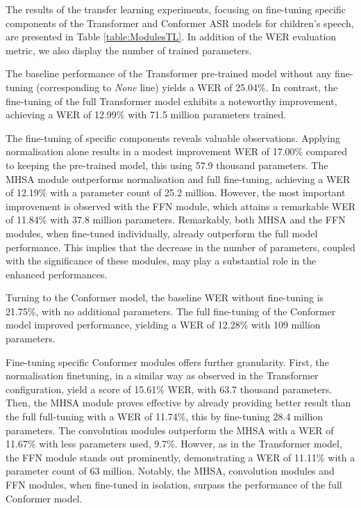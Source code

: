 The results  of the transfer learning experiments, focusing on fine-tuning specific components of the Transformer and Conformer ASR models for children's speech, are presented in Table \ref{table:ModulesTL}. In addition of the WER evaluation metric, we also display the number of trained parameters. 

The baseline performance of the Transformer pre-trained model without any fine-tuning (corresponding to \textit{None} line) yields a WER of 25.04\%. In contrast, the fine-tuning of the full Transformer model exhibits a noteworthy improvement, achieving a WER of 12.99\% with 71.5 million parameters trained.

The fine-tuning of specific components reveals valuable observations. Applying normalisation alone results in a modest improvement WER of 17.00\% compared to keeping the pre-trained model, this using 57.9 thousand parameters. The MHSA module outperforms normalisation and full fine-tuning, achieving a WER of 12.19\% with a parameter count of 25.2 million. However, the most important improvement is observed with the FFN module, which attains a remarkable WER of 11.84\% with 37.8 million parameters. Remarkably, both MHSA and the FFN modules, when fine-tuned individually, already outperform the full model performance. This implies that the decrease in the number of parameters, coupled with the significance of these modules, may play a substantial role in the enhanced performances.

Turning to the Conformer model, the baseline WER without fine-tuning is 21.75\%, with no additional parameters. The full fine-tuning of the Conformer model improved performance, yielding a WER of 12.28\% with 109 million parameters.

Fine-tuning specific Conformer modules offers further granularity. First, the normalisation finetuning, in a similar way as observed in the Transformer configuration, yield a score of 15.61\% WER, with 63.7 thousand parameters. Then,  the MHSA module proves effective by already providing better result than the full full-tuning with a WER of 11.74\%, this by fine-tuning 28.4 million parameters. The convolution modules outperform the MHSA with a WER of 11.67\% with less parameters used, 9.7\%. Howver, as in the Transformer model, the FFN module stands out prominently, demonstrating a WER of 11.11\% with a parameter count of 63 million. Notably, the MHSA, convolution modules and FFN modules, when fine-tuned in isolation, surpass the performance of the full Conformer model.


